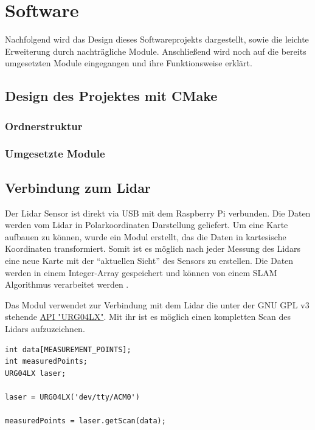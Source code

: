 \chapter{Software}
Nachfolgend wird das Design dieses Softwareprojekts dargestellt, sowie die leichte Erweiterung durch nachträgliche Module. Anschließend wird noch auf die bereits umgesetzten Module eingegangen und ihre Funktionsweise erklärt. 

\section{Design des Projektes mit CMake}


\subsection{Ordnerstruktur}

\subsection{Umgesetzte Module}







\section{Verbindung zum Lidar}

Der Lidar Sensor ist direkt via USB mit dem Raspberry Pi verbunden. Die Daten werden vom Lidar in Polarkoordinaten Darstellung geliefert. Um eine Karte aufbauen zu können, wurde ein Modul erstellt, das die Daten in kartesische Koordinaten transformiert. Somit ist es möglich nach jeder Messung des Lidars eine neue Karte mit der "`aktuellen Sicht"' des Sensors zu erstellen. Die Daten werden in einem Integer-Array gespeichert und können von einem SLAM Algorithmus verarbeitet werden . 

Das Modul verwendet zur Verbindung mit dem Lidar die unter der GNU GPL v3 stehende \href{https://github.com/simondlevy/BreezyLidar}{API "URG04LX"}. Mit ihr ist es möglich einen kompletten Scan des Lidars aufzuzeichnen. 
\vspace{0.4cm}

\begin{lstlisting}
int data[MEASUREMENT_POINTS]; 
int measuredPoints;
URG04LX laser;

laser = URG04LX('dev/tty/ACM0')

measuredPoints = laser.getScan(data);

\end{lstlisting}
\vspace{-0.6cm}

